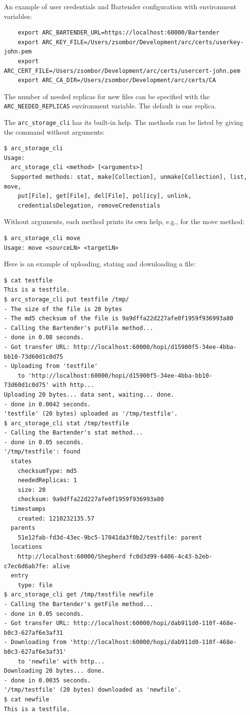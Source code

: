 \documentclass{book}
\begin{document}
An example of user credentials and Bartender configuration with environment variables:

\begin{verbatim}
    export ARC_BARTENDER_URL=https://localhost:60000/Bartender
    export ARC_KEY_FILE=/Users/zsombor/Development/arc/certs/userkey-john.pem
    export ARC_CERT_FILE=/Users/zsombor/Development/arc/certs/usercert-john.pem 
    export ARC_CA_DIR=/Users/zsombor/Development/arc/certs/CA    
\end{verbatim}

The number of needed replicas for new files can be specified with the \verb!ARC_NEEDED_REPLICAS! environment variable. The default is one replica.

The \verb!arc_storage_cli! has its built-in help. The methods can be listed by giving the command without arguments:

\begin{verbatim}
$ arc_storage_cli
Usage:
  arc_storage_cli <method> [<arguments>]
  Supported methods: stat, make[Collection], unmake[Collection], list, move,
    put[File], get[File], del[File], pol[icy], unlink,
    credentialsDelegation, removeCredenstials
\end{verbatim}
Without arguments, each method prints its own help, e.g., for the move method:
\begin{verbatim}
$ arc_storage_cli move
Usage: move <sourceLN> <targetLN>
\end{verbatim}

Here is an example of uploading, stating and downloading a file:

\begin{verbatim}
$ cat testfile 
This is a testfile.
$ arc_storage_cli put testfile /tmp/
- The size of the file is 20 bytes
- The md5 checksum of the file is 9a9dffa22d227afe0f1959f936993a80
- Calling the Bartender's putFile method...
- done in 0.08 seconds.
- Got transfer URL: http://localhost:60000/hopi/d15900f5-34ee-4bba-bb10-73d60d1c0d75
- Uploading from 'testfile'
    to 'http://localhost:60000/hopi/d15900f5-34ee-4bba-bb10-73d60d1c0d75' with http...
Uploading 20 bytes... data sent, waiting... done.
- done in 0.0042 seconds.
'testfile' (20 bytes) uploaded as '/tmp/testfile'.
$ arc_storage_cli stat /tmp/testfile
- Calling the Bartender's stat method...
- done in 0.05 seconds.
'/tmp/testfile': found
  states
    checksumType: md5
    neededReplicas: 1
    size: 20
    checksum: 9a9dffa22d227afe0f1959f936993a80
  timestamps
    created: 1210232135.57
  parents
    51e12fab-fd3d-43ec-9bc5-17041da3f0b2/testfile: parent
  locations
    http://localhost:60000/Shepherd fc0d3d99-6406-4c43-b2eb-c7ec6d6ab7fe: alive
  entry
    type: file
$ arc_storage_cli get /tmp/testfile newfile
- Calling the Bartender's getFile method...
- done in 0.05 seconds.
- Got transfer URL: http://localhost:60000/hopi/dab911d0-110f-468e-b0c3-627af6e3af31
- Downloading from 'http://localhost:60000/hopi/dab911d0-110f-468e-b0c3-627af6e3af31'
    to 'newfile' with http...
Downloading 20 bytes... done.
- done in 0.0035 seconds.
'/tmp/testfile' (20 bytes) downloaded as 'newfile'.
$ cat newfile 
This is a testfile.
\end{verbatim}
\end{document}
